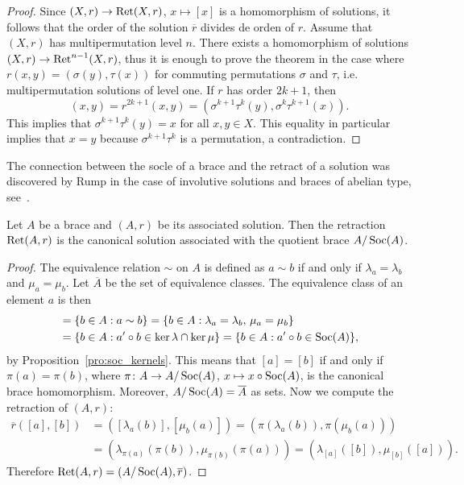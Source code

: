 \begin{proof}
    Since $(X,r)\to\operatorname{Ret}(X,r)$, $x\mapsto[x]$ is a homomorphism of solutions, 
    it follows that the order of the solution $\overline{r}$ divides de orden of $r$. 
    Assume that $(X,r)$ has multipermutation level $n$. 
    There exists a homomorphism of solutions $(X,r)\to\operatorname{Ret}^{n-1}(X,r)$, thus 
    it is enough to prove the theorem in the case where
    $r(x,y)=(\sigma(y),\tau(x))$ for commuting permutations $\sigma$ and $\tau$, i.e. 
    multipermutation solutions of level one. If $r$ has order $2k+1$, then 
    \[
    (x,y)=r^{2k+1}(x,y)=(\sigma^{k+1}\tau^k(y),\sigma^k\tau^{k+1}(x)).
    \]
    This implies that $\sigma^{k+1}\tau^k(y)=x$ for all $x,y\in X$. This equality in particular 
    implies that $x=y$ because $\sigma^{k+1}\tau^k$ is a permutation, a contradiction. 
\end{proof}

The connection between the socle of a brace and the 
retract of a solution was discovered by Rump in the case of 
involutive solutions and braces of abelian type, see~\cite{MR2278047}. 

\begin{proposition}
\label{pro:add_cyclic}
Let $A$ be a brace and $(A,r)$ be its associated solution. 
Then the retraction $\operatorname{Ret}(A,r)$ is the canonical solution associated with the quotient brace $A/\operatorname{Soc}(A)$. 
\end{proposition}

\begin{proof}
    The equivalence relation $\sim$ on $A$ is defined as $a\sim b$ if and only if $\lambda_a=\lambda_b$ and 
    $\mu_a=\mu_b$. Let $\overline{A}$ be the set of equivalence classes. 
    The equivalence class of an element $a$ is then
    \begin{align*}
    [a]&=\{b\in A:a\sim b\}
    =\{b\in A:\lambda_a=\lambda_b,\,\mu_a=\mu_b\}\\
    &=\{b\in A:a'\circ b\in \ker\lambda\cap\ker\mu\}=\{b\in A:a'\circ b\in\Soc(A)\},
    \end{align*}
    by Proposition~\ref{pro:soc_kernels}. This means that 
    $[a]=[b]$ if and only if $\pi(a)=\pi(b)$, where $\pi\colon A\to A/\operatorname{Soc}(A)$, $x\mapsto x\circ\operatorname{Soc}(A)$,  
    is the canonical brace homomorphism. Moreover, $A/\operatorname{Soc}(A)=\overline{A}$ as sets. 
    Now we compute the retraction of $(A,r)$:
    \begin{align*}
        \overline{r}([a],[b]) &= ([\lambda_a(b)],[\mu_b(a)])
        =(\pi(\lambda_a(b)),\pi(\mu_b(a)))\\
        &=\left(\lambda_{\pi(a)}(\pi(b)),\mu_{\pi(b)}(\pi(a))\right)
        =\left(\lambda_{[a]}([b]),\mu_{[b]}([a])\right).
    \end{align*}
    Therefore $\operatorname{Ret}(A,r)=(A/\operatorname{Soc}(A),\overline{r})$. 
\end{proof}

